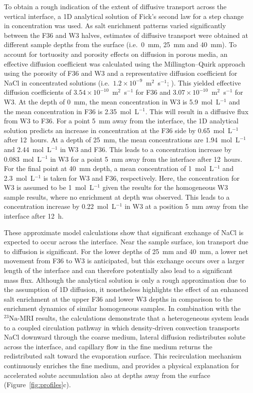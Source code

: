 \documentclass[final]{agujournal2019}
\newcommand{\NaIso}{\ensuremath{^{23}\mathrm{Na}}}
\begin{document}
To obtain a rough indication of the extent of diffusive transport across the
vertical interface, a 1D analytical solution of Fick's second law for a step
change in concentration was used. As salt enrichment patterns varied
significantly between the F36 and W3 halves, estimates of diffusive transport were
obtained at different sample depths from the surface (i.e.\ 0~mm, 25~mm and
40~mm). To account for tortuosity and porosity effects on diffusion in porous
media, an effective diffusion coefficient was calculated using the
Millington--Quirk approach \cite{millington1961} using the porosity of F36 and W3
and a representative diffusion coefficient for NaCl in concentrated solutions
(i.e.\ $1.2\times10^{-9}$~m$^2$~s$^{-1}$; ). This yielded
effective diffusion coefficients of $3.54\times10^{-10}$~m$^2$~s$^{-1}$ for F36
and $3.07\times10^{-10}$~m$^2$~s$^{-1}$ for W3. At the depth of 0~mm, the mean
concentration in W3 is 5.9~mol~L$^{-1}$ and the mean concentration in F36 is
2.35~mol~L$^{-1}$. This will result in a diffusive flux from W3 to F36. For a
point 5~mm away from the interface, the 1D analytical solution predicts an
increase in concentration at the F36 side by 0.65~mol~L$^{-1}$ after 12~hours. At
a depth of 25~mm, the mean concentrations are 1.94~mol~L$^{-1}$ and
2.44~mol~L$^{-1}$ in W3 and F36. This leads to a concentration increase by
0.083~mol~L$^{-1}$ in W3 for a point 5~mm away from the interface after
12~hours. For the final point at 40~mm depth, a mean concentration of
1~mol~L$^{-1}$ and 2.3~mol~L$^{-1}$ is taken for W3 and F36, respectively. Here,
the concentration for W3 is assumed to be 1~mol~L$^{-1}$ given the results for the
homogeneous W3 sample results, where no enrichment at depth was observed. This
leads to a concentration increase by 0.22~mol~L$^{-1}$ in W3 at a position 5~mm
away from the interface after 12~h.

These approximate model calculations show that significant exchange of NaCl is
expected to occur across the interface. Near the sample surface, ion transport
due to diffusion is significant. For the lower depths of 25~mm and 40~mm, a lower
net movement from F36 to W3 is anticipated, but this exchange occurs over a larger
length of the interface and can therefore potentially also lead to a significant
mass flux. Although the analytical solution is only a rough approximation due to
the assumption of 1D diffusion, it nonetheless highlights the effect of an
enhanced salt enrichment at the upper F36 and lower W3 depths in comparison to
the enrichment dynamics of similar homogeneous samples. In combination with the
\NaIso-MRI results, the calculations demonstrate that a heterogeneous system leads
to a coupled circulation pathway in which density-driven convection transports
NaCl downward through the coarse medium, lateral diffusion redistributes solute
across the interface, and capillary flow in the fine medium returns the
redistributed salt toward the evaporation surface. This recirculation mechanism
continuously enriches the fine medium, and provides a physical explanation for
accelerated solute accumulation also at depths away from the surface
(Figure~\ref{fig:profiles}c).
\end{document}
